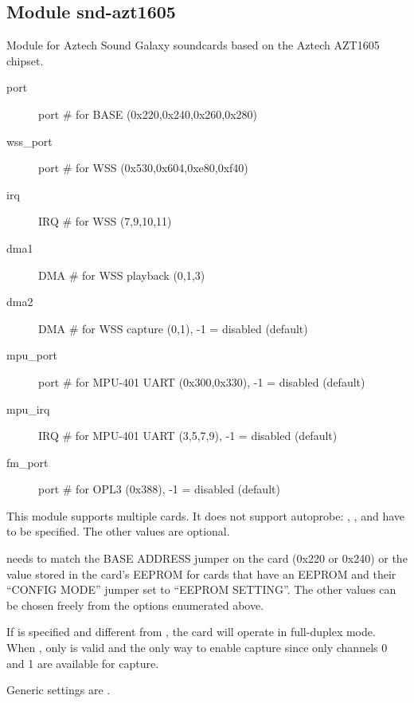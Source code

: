 \documentclass[a4paper,8pt,english]{sphinxmanual}
\begin{document}
\subsection{Module snd-azt1605}
\label{sound/alsa-configuration:module-snd-azt1605}
Module for Aztech Sound Galaxy soundcards based on the Aztech AZT1605
chipset.
\begin{description}
\item[{port}] \leavevmode
port \# for BASE (0x220,0x240,0x260,0x280)

\item[{wss\_port}] \leavevmode
port \# for WSS (0x530,0x604,0xe80,0xf40)

\item[{irq}] \leavevmode
IRQ \# for WSS (7,9,10,11)

\item[{dma1}] \leavevmode
DMA \# for WSS playback (0,1,3)

\item[{dma2}] \leavevmode
DMA \# for WSS capture (0,1), -1 = disabled (default)

\item[{mpu\_port}] \leavevmode
port \# for MPU-401 UART (0x300,0x330), -1 = disabled (default)

\item[{mpu\_irq}] \leavevmode
IRQ \# for MPU-401 UART (3,5,7,9), -1 = disabled (default)

\item[{fm\_port}] \leavevmode
port \# for OPL3 (0x388), -1 = disabled (default)

\end{description}

This module supports multiple cards. It does not support autoprobe:
, ,  and  have to be specified.
The other values are optional.

 needs to match the BASE ADDRESS jumper on the card (0x220 or 0x240)
or the value stored in the card's EEPROM for cards that have an EEPROM and
their ``CONFIG MODE'' jumper set to ``EEPROM SETTING''. The other values can
be chosen freely from the options enumerated above.

If  is specified and different from , the card will operate in
full-duplex mode. When , only  is valid and the only way to
enable capture since only channels 0 and 1 are available for capture.

Generic settings are .
\end{document}
